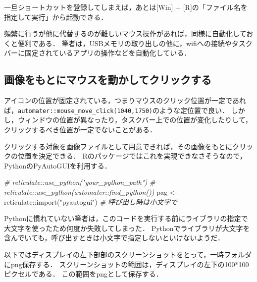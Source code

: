 \documentclass[
]{article}
\newenvironment{Shaded}{\begin{snugshade}}{\end{snugshade}}
\newcommand{\CommentTok}[1]{\textcolor[rgb]{0.56,0.35,0.01}{\textit{#1}}}
\newcommand{\FunctionTok}[1]{\textcolor[rgb]{0.00,0.00,0.00}{#1}}
\newcommand{\NormalTok}[1]{#1}
\newcommand{\OtherTok}[1]{\textcolor[rgb]{0.56,0.35,0.01}{#1}}
\newcommand{\SpecialCharTok}[1]{\textcolor[rgb]{0.00,0.00,0.00}{#1}}
\newcommand{\StringTok}[1]{\textcolor[rgb]{0.31,0.60,0.02}{#1}}
\begin{document}
一旦ショートカットを登録してしまえば，あとは{[}Win{]} + {[}R{]}の「ファイル名を指定して実行」から起動できる．

頻繁に行うが他に代替するのが難しいマウス操作があれば，同様に自動化しておくと便利である．
筆者は，USBメモリの取り出しの他に，wifiへの接続やタスクバーに固定されているアプリの操作などを自動化している．

\hypertarget{ux753bux50cfux3092ux3082ux3068ux306bux30deux30a6ux30b9ux3092ux52d5ux304bux3057ux3066ux30afux30eaux30c3ux30afux3059ux308b}{%
\subsection{画像をもとにマウスを動かしてクリックする}\label{ux753bux50cfux3092ux3082ux3068ux306bux30deux30a6ux30b9ux3092ux52d5ux304bux3057ux3066ux30afux30eaux30c3ux30afux3059ux308b}}

アイコンの位置が固定されている，つまりマウスのクリック位置が一定であれば，\texttt{automater::mouse\_move\_click(1040,1750)}のような定位置で良い．
しかし，ウィンドウの位置が異なったり，タスクバー上での位置が変化したりして，クリックするべき位置が一定でないことがある．

クリックする対象を画像ファイルとして用意できれば，その画像をもとにクリックの位置を決定できる．
Rのパッケージではこれを実現できなさそうなので，PythonのPyAutoGUIを利用する．

\begin{Shaded}
\begin{Highlighting}[]
  \CommentTok{\# reticulate::use\_python("your\_python\_path")}
  \CommentTok{\# reticulate::use\_python(automater::find\_python())}
\NormalTok{pag }\OtherTok{\textless{}{-}}\NormalTok{ reticulate}\SpecialCharTok{::}\FunctionTok{import}\NormalTok{(}\StringTok{"pyautogui"}\NormalTok{)  }\CommentTok{\# 呼び出し時は小文字で}
\end{Highlighting}
\end{Shaded}

Pythonに慣れていない筆者は，このコードを実行する前にライブラリの指定で大文字を使ったため何度か失敗してしまった．
Pythonでライブラリが大文字を含んでいても，呼び出すときは小文字で指定しないといけないようだ．

以下ではディスプレイの左下部部のスクリーンショットをとって，一時フォルダにpng保存する．
スクリーンショットの範囲は，ディスプレイの左下の100*100ピクセルである．
この範囲をpngとして保存する．
\end{document}
